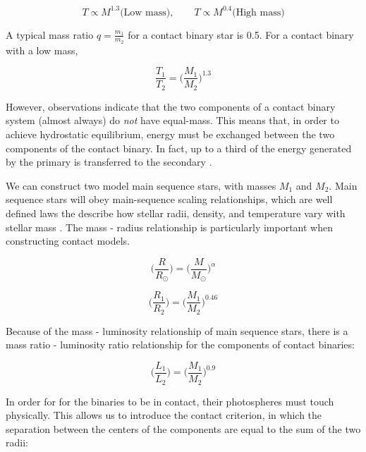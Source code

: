 \documentclass[12pt]{article} %
\numberwithin{equation}{section} %
\begin{document}
\begin{equation} \label{homology_T_reprint}
T \propto M^{1.3} \text{(Low mass)}, \qquad T \propto M^{0.4} \text{(High mass)} 
\end{equation}

A typical mass ratio $q = \frac{m_{1}}{m_{2}}$ for a contact binary star is 0.5. For a contact binary with a low mass,

\begin{equation}
\frac{T_{1}}{T_{2}} = \Big( \frac{M_{1}}{M_{2}} \Big)^{1.3}
\end{equation}

However, observations indicate that the two components of a contact binary system (almost always) do \emph{not} have equal-mass. This means that, in order to achieve hydrostatic equilibrium, energy must be exchanged between the two components of the contact binary. In fact, up to a third of the energy generated by the primary is transferred to the secondary \citep{mochnacki1981contact}.

We can construct two model main sequence stars, with masses $M_{1}$ and $M_{2}$. Main sequence stars will obey main-sequence scaling relationships, which are well defined laws the describe how stellar radii, density, and temperature vary with stellar mass \citep{kippenhahn1990stellar}. The mass - radius relationship is particularly important when constructing contact models. 

\begin{equation} \label{eqn: mass_radius}
 \bigg( \frac{R}{R_{\odot}} \bigg) = \bigg( \frac{M}{M_{\odot}} \bigg)^{\alpha}
\end{equation}

\begin{equation} \label{eqn: roche_mass_radius}
\bigg( \frac{R_{1}}{R_{2}} \bigg) = \bigg( \frac{M_{1}}{M_{2}} \bigg)^{0.46}
\end{equation}

Because of the mass - luminosity relationship of main sequence stars, there is a mass ratio - luminosity ratio relationship for the components of contact binaries: 

\begin{equation} \label{eqn: luminosity_radius}
\bigg( \frac{L_{1}}{L_{2}} \bigg) = \bigg( \frac{M_{1}}{M_{2}} \bigg)^{0.9}
\end{equation}


In order for for the binaries to be in contact, their photospheres must touch physically. This allows us to introduce the contact criterion, in which the separation between the centers of the components are equal to the sum of the two radii:
\end{document}
